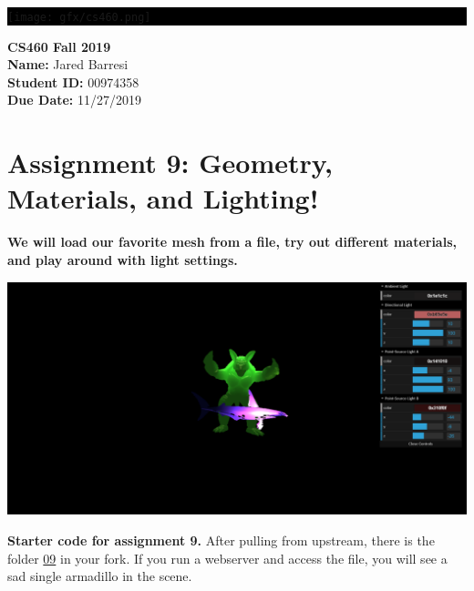 \documentclass[10pt,oneside,onecolumn,letterpaper]{article}
\begin{document}
\noindent\colorbox{black}{
\begin{minipage}[c]{.99\linewidth}
  \vspace{.4cm}
  \Large{}
  \begin{flushright}
    \vspace{-1.2cm}
    \texttt{[image: gfx/cs460.png]}
  \end{flushright}
\end{minipage}
}


\vspace{.5cm} %

\noindent\textbf{CS460 Fall 2019} \\
\textbf{Name:} Jared Barresi \\
\textbf{Student ID:} 00974358 \\
\textbf{Due Date:} 11/27/2019

\section*{Assignment 9: Geometry, Materials, and Lighting!}

\textbf{We will load our favorite mesh from a file, try out different materials, and play around with light settings.}

\vspace{.5cm} %

\begin{center}
\includegraphics[width=.5\textwidth]{gfx/screenshot-1.png}
\end{center}

\vspace{.5cm}

\noindent\textbf{Starter code for assignment 9.} After pulling from upstream, there is the folder \url{09} in your fork. If you run a webserver and access the file, you will see a sad single armadillo in the scene.

\vspace{.5cm}
\end{document}
